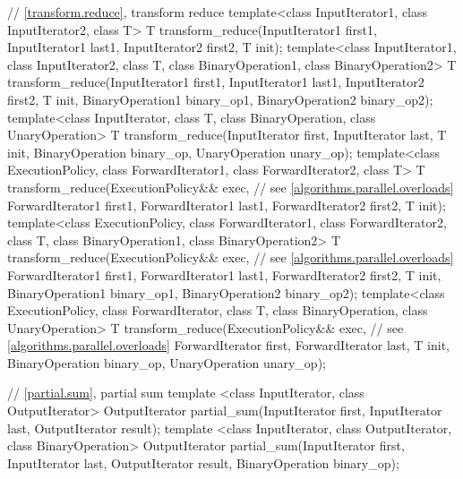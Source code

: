 \begin{codeblock}
{  // \ref{transform.reduce}, transform reduce
  template<class InputIterator1, class InputIterator2, class T>
    T transform_reduce(InputIterator1 first1, InputIterator1 last1,
                       InputIterator2 first2,
                       T init);
  template<class InputIterator1, class InputIterator2, class T,
           class BinaryOperation1, class BinaryOperation2>
    T transform_reduce(InputIterator1 first1, InputIterator1 last1,
                       InputIterator2 first2,
                       T init,
                       BinaryOperation1 binary_op1,
                       BinaryOperation2 binary_op2);
  template<class InputIterator, class T,
           class BinaryOperation, class UnaryOperation>
    T transform_reduce(InputIterator first, InputIterator last,
                       T init,
                       BinaryOperation binary_op, UnaryOperation unary_op);
  template<class ExecutionPolicy,
           class ForwardIterator1, class ForwardIterator2, class T>
    T transform_reduce(ExecutionPolicy&& exec, // see \ref{algorithms.parallel.overloads}
                       ForwardIterator1 first1, ForwardIterator1 last1,
                       ForwardIterator2 first2,
                       T init);
  template<class ExecutionPolicy,
           class ForwardIterator1, class ForwardIterator2, class T,
           class BinaryOperation1, class BinaryOperation2>
    T transform_reduce(ExecutionPolicy&& exec, // see \ref{algorithms.parallel.overloads}
                       ForwardIterator1 first1, ForwardIterator1 last1,
                       ForwardIterator2 first2,
                       T init,
                       BinaryOperation1 binary_op1,
                       BinaryOperation2 binary_op2);
  template<class ExecutionPolicy,
           class ForwardIterator, class T,
           class BinaryOperation, class UnaryOperation>
    T transform_reduce(ExecutionPolicy&& exec, // see \ref{algorithms.parallel.overloads}
                       ForwardIterator first, ForwardIterator last,
                       T init,
                       BinaryOperation binary_op, UnaryOperation unary_op);

  // \ref{partial.sum}, partial sum
  template <class InputIterator, class OutputIterator>
    OutputIterator partial_sum(InputIterator first,
                               InputIterator last,
                               OutputIterator result);
  template <class InputIterator, class OutputIterator, class BinaryOperation>
    OutputIterator partial_sum(InputIterator first,
                               InputIterator last,
                               OutputIterator result,
                               BinaryOperation binary_op);

}
\end{codeblock}
